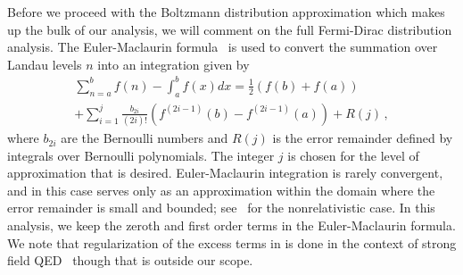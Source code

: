 \label{sec:eulermac}
\noindent Before we proceed with the Boltzmann distribution approximation which makes up the bulk of our analysis, we will comment on the full Fermi-Dirac distribution analysis. The Euler-Maclaurin formula~\cite{abramowitz1988handbook} is used to convert the summation over Landau levels $n$ into an integration given by
\begin{multline}
 \label{eulermaclaurin}\sum^{b}_{n=a}f(n)-\int^{b}_{a}f(x)dx = \frac{1}{2}\left(f(b)+f(a)\right)\\
 +\sum_{i=1}^{j}\frac{b_{2i}}{(2i)!}\left(f^{(2i-1)}(b)-f^{(2i-1)}(a)\right)+R(j)\,,
\end{multline}
where $b_{2i}$ are the Bernoulli numbers and $R(j)$ is the error remainder defined by integrals over Bernoulli polynomials. The integer $j$ is chosen for the level of approximation that is desired. Euler-Maclaurin integration is rarely convergent, and in this case serves only as an approximation within the domain where the error remainder is small and bounded; see~\cite{greiner2012thermodynamics} for the nonrelativistic case. In this analysis, we keep the zeroth and first order terms in the Euler-Maclaurin formula. We note that regularization of the excess terms in  is done in the context of strong field QED~\cite{greiner2008quantum} though that is outside our scope.

